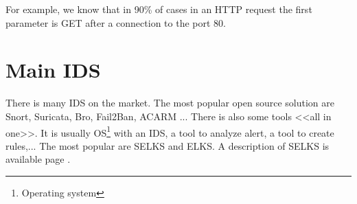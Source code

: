 For example, we know that in 90\% of cases in an HTTP request the first parameter is GET after a connection to the
port 80.


%



\section{Main IDS}

There is many IDS on the market. The most popular open source solution are Snort, Suricata, Bro, Fail2Ban, ACARM
... There is also some tools <<all in one>>. It is usually OS\footnote{Operating system} with an IDS, a tool to
analyze alert, a tool to create rules,... The most popular are SELKS and ELKS. A description of SELKS is available
page \pageref{chap:selks}.





